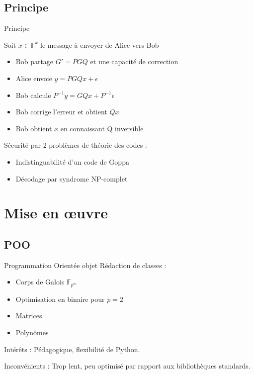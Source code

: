 \documentclass{beamer}
\begin{document}
		\subsection{Principe}

			\begin{frame}{Principe}

				Soit $x \in \mathbb{F}^{k}$ le message à envoyer de Alice vers Bob

				\begin{itemize}
					\item Bob partage $G'=PGQ$ et une capacité de correction
					\item Alice envoie $y = PGQx + \epsilon$
					\item Bob calcule $P^{-1}y = GQx + P^{-1}\epsilon $
					\item Bob corrige l'erreur et obtient $Qx$
					\item Bob obtient $x$ en connaissant Q inversible
				\end{itemize}

				Sécurité par 2 problèmes de théorie des codes :
				\begin{itemize}
					\item Indistinguabilité d'un code de Goppa
					\item Décodage par syndrome NP-complet
				\end{itemize}

			\end{frame}

		

	\section{Mise en œuvre}

		\subsection{POO}

			\begin{frame}{Programmation Orientée objet}
				Rédaction de classes :
				\begin{itemize}
					\item Corps de Galois $\mathbb{F}_{p^{m}}$
					\item Optimisation en binaire pour $p=2$
					\item Matrices
					\item Polynômes
				\end{itemize}

				Intérêts : Pédagogique, flexibilité de Python.

				Inconvénients : Trop lent, peu optimisé par rapport aux bibliothèques standards.

			\end{frame}
\end{document}

